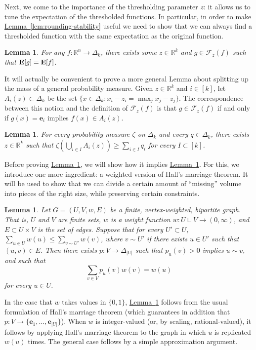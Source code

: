 \documentclass[11pt]{article}
\numberwithin{equation}{section}
\newtheorem{lemma}[theorem]{Lemma}
\theoremstyle{definition}
\theoremstyle{plain}
\newcommand{\R}{\mathbb R}
\newcommand{\expref}[2]{\hyperref[#2]{#1~\ref{#2}}}
\newcommand{\E}{{\bf E}}
\newcommand{\calF}{\mathcal{F}}
\begin{document}
Next, we come to the importance of the thresholding parameter $z$: it allows us to tune the expectation of the thresholded functions. In particular, in order to make \expref{Lemma}{lem:rounding-stability} useful we need to show that we can always find a thresholded function with the same expectation as the original function.

\begin{lemma}\label{lem:rounding-existence}
  For any $f: \R^n \to \Delta_k$, there exists some $z\in \R^k$ and $g \in \calF_z(f)$ such that $\E[g] = \E[f]$.
\end{lemma}

It will actually be convenient to prove a more general Lemma about splitting up the mass of a general probability measure.
Given $z \in \R^k$ and $i \in [k]$, let $A_i(z) \subset \Delta_k$ be the set $\{x \in \Delta_k: x_i - z_i = \max_j x_j - z_j\}$. The correspondence between this notion and the definition of $\calF_z(f)$ is that $g \in \calF_z(f)$ if and only if $g(x) = \mathbf{e}_i$ implies $f(x) \in A_i(z)$.

\begin{lemma}\label{lem:rounding-prob-measure}
  For every probability measure $\zeta$ on $\Delta_k$ and every $q \in \Delta_k$,
  there exists $z \in \R^k$ such that $\zeta(\bigcup_{i \in I} A_i(z)) \ge \sum_{i \in I} q_i$ for every $I \subset [k]$.
\end{lemma}

Before proving \expref{Lemma}{lem:rounding-prob-measure}, we will show how it implies \expref{Lemma}{lem:rounding-existence}.
For this, we introduce one more ingredient: a weighted version of Hall's marriage theorem.
It will be used to show that we can divide a certain amount of ``missing'' volume into pieces of the right size,
while preserving certain constraints.

\begin{lemma}\label{lem:hall}
  Let $G = (U, V, w, E)$ be a finite, vertex-weighted, bipartite graph. That is, $U$ and $V$ are finite sets, $w$ is a weight function $w: U \sqcup V \to (0, \infty)$, and $E \subset U \times V$ is the
  set of edges. Suppose that for every $U' \subset U$, $\sum_{u \in U} w(u) \le \sum_{v \sim U'} w(v)$, where $v \sim U'$ if there exists $u \in U'$ such that $(u, v) \in E$. Then
  there exists $p: V \to \Delta_{|U|}$ such that $p_u(v) > 0$ implies $u \sim v$, and such that
  \[
    \sum_{v \in V} p_u(v) w(v) = w(u)
  \]
  for every $u \in U$.
\end{lemma}
In the case that $w$ takes values in $\{0, 1\}$, \expref{Lemma}{lem:hall} follows from the usual formulation of Hall's marriage theorem
(which guarantees in addition that $p: V \to \{\mathbf{e}_1, \dots, \mathbf{e}_{|U|}\}$). When
$w$ is integer-valued (or, by scaling, rational-valued), it follows by applying Hall's marriage
theorem to the graph in which $u$ is replicated $w(u)$ times. The general case follows by
a simple approximation argument.
\end{document}
